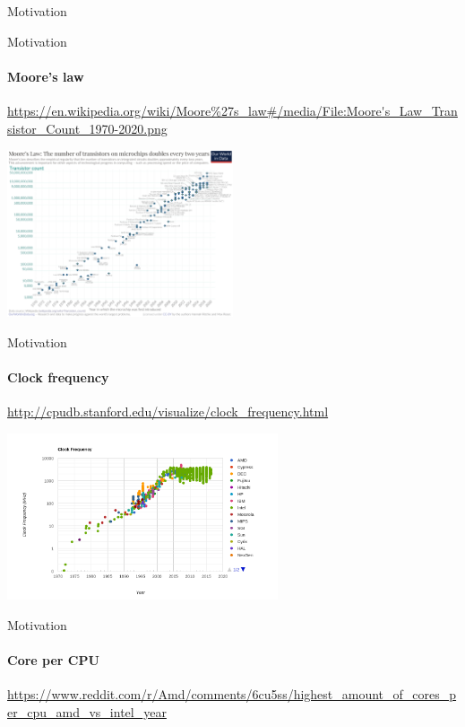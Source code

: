 \begin{section}{Motivation}

\begin{frame}[fragile]{Motivation}
\framesubtitle{Moore's law}

{\tiny\url{https://en.wikipedia.org/wiki/Moore%27s_law#/media/File:Moore's_Law_Transistor_Count_1970-2020.png}}

\begin{center}
\includegraphics[width=0.5\textwidth]{./pics/transistor_count.png}
\end{center}

\end{frame}


\begin{frame}[fragile]{Motivation}
\framesubtitle{Clock frequency}

{\tiny\url{http://cpudb.stanford.edu/visualize/clock_frequency.html}}

\begin{center}
\includegraphics[width=0.6\textwidth]{./pics/clock_freq.png}
\end{center}

\end{frame}



\begin{frame}[fragile]{Motivation}
\framesubtitle{Core per CPU}

{\tiny\url{https://www.reddit.com/r/Amd/comments/6cu5ss/highest_amount_of_cores_per_cpu_amd_vs_intel_year}}


\end{frame}
\end{section}

